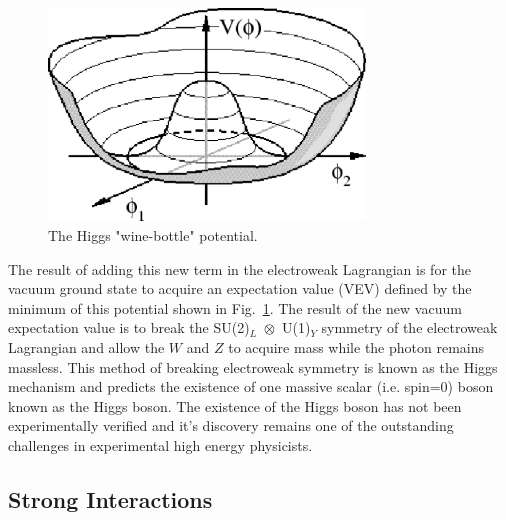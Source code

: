 \begin{figure}[!h!tbp]
\begin{center}
\includegraphics[width=0.75\textwidth]{eps/Theory/HiggsPotential.eps}
\end{center}
\vspace{-0.1in}
\caption{The Higgs "wine-bottle" potential.}
\label{HiggsPotential}
\end{figure}

The result of adding this new term in the electroweak Lagrangian is for the vacuum ground state to acquire an expectation value (VEV) defined by the minimum of this potential shown in Fig.~\ref{HiggsPotential}. The result of the new vacuum expectation value is to break the \mbox{SU(2)$_{L}$ $\otimes$ U(1)$_{Y}$} symmetry of the electroweak Lagrangian and allow the $W$ and $Z$ to acquire mass while the photon remains massless. This method of breaking electroweak symmetry is known as the Higgs mechanism and predicts the existence of one massive scalar (i.e. spin=0) boson known as the Higgs boson. The existence of the Higgs boson has not been experimentally verified and it's discovery remains one of the outstanding challenges in experimental high energy physicists.


\subsection{Strong Interactions}
\label{strong}

